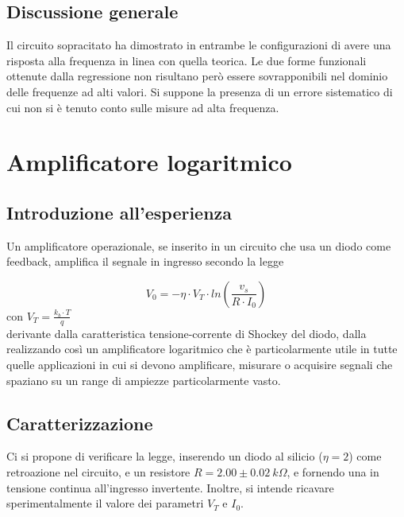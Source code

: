 \documentclass[journal]{IEEEtran}
\begin{document}
\subsection{\textbf{Discussione generale}}
Il circuito sopracitato ha dimostrato in entrambe le configurazioni di avere una risposta alla frequenza in linea con quella teorica. Le due forme funzionali ottenute dalla regressione non risultano però essere sovrapponibili nel dominio delle frequenze ad alti valori. Si suppone la presenza di un errore sistematico di cui non si è tenuto conto sulle misure ad alta frequenza.


\section{\textbf{Amplificatore logaritmico}} %
\subsection{\textbf{Introduzione all'esperienza}}
Un amplificatore operazionale, se inserito in un circuito che usa un diodo come feedback, amplifica il segnale in ingresso secondo la legge

\begin{equation}
V_0 = - \eta \cdot V_T \cdot ln( \frac{v_s}{R \cdot I_0} )
\end{equation}
con $V_T = \frac{k_{b} \cdot T}{q}$ \\

derivante dalla caratteristica tensione-corrente di Shockey del diodo, dalla realizzando così un amplificatore logaritmico che è particolarmente utile in tutte quelle applicazioni in cui si devono amplificare, misurare o acquisire segnali che spaziano su un range di ampiezze particolarmente vasto.

\subsection{\textbf{Caratterizzazione}}
Ci si propone di verificare la legge, inserendo un diodo al silicio ($\eta = 2$) come retroazione nel circuito, e un resistore $R = 2.00 \pm 0.02 \ k\Omega$, e fornendo una in tensione continua all'ingresso invertente. Inoltre, si intende ricavare sperimentalmente il valore dei parametri $V_T$ e $I_0$.
\end{document}
